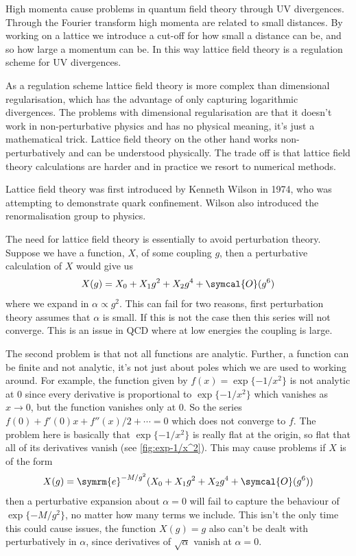 \documentclass[fleqn]{NotesClass}
\newcommand{\e}{\symrm{e}}
\newcommand{\order}{\symcal{O}}
\begin{document}
    High momenta cause problems in quantum field theory through UV divergences.
    Through the Fourier transform high momenta are related to small distances.
    By working on a lattice we introduce a cut-off for how small a distance can be, and so how large a momentum can be.
    In this way lattice field theory is a regulation scheme for UV divergences.
    
    As a regulation scheme lattice field theory is more complex than dimensional regularisation, which has the advantage of only capturing logarithmic divergences.
    The problems with dimensional regularisation are that it doesn't work in non-perturbative physics and has no physical meaning, it's just a mathematical trick.
    Lattice field theory on the other hand works non-perturbatively and can be understood physically.
    The trade off is that lattice field theory calculations are harder and in practice we resort to numerical methods.
    
    Lattice field theory was first introduced by Kenneth Wilson in 1974, who was attempting to demonstrate quark confinement.
    Wilson also introduced the renormalisation group to physics.
    
    The need for lattice field theory is essentially to avoid perturbation theory.
    Suppose we have a function, \(X\), of some coupling \(g\), then a perturbative calculation of \(X\) would give us
    \begin{equation}
        X(g) = X_0 + X_1 g^2 + X_2 g^4 + \order(g^6)
    \end{equation}
    where we expand in \(\alpha \propto g^2\).
    This can fail for two reasons, first perturbation theory assumes that \(\alpha\) is small.
    If this is not the case then this series will not converge.
    This is an issue in QCD where at low energies the coupling is large.
    
    The second problem is that not all functions are analytic.
    Further, a function can be finite and not analytic, it's not just about poles which we are used to working around.
    For example, the function given by \(f(x) = \exp\{-1/x^2\}\) is not analytic at 0 since every derivative is proportional to \(\exp\{-1/x^2\}\) which vanishes as \(x \to 0\), but the function vanishes only at \(0\).
    So the series \(f(0) + f'(0)x + f''(x)/2 + \dotsb = 0\) which does not converge to \(f\).
    The problem here is basically that \(\exp\{-1/x^2\}\) is really flat at the origin, so flat that all of its derivatives vanish (see \cref{fig:exp-1/x^2}).
    This may cause problems if \(X\) is of the form
    \begin{equation}
        X(g) = \e^{-M/g^2} (X_0 + X_1 g^2 + X_2g^4 + \order(g^6))
    \end{equation}
    then a perturbative expansion about \(\alpha = 0\) will fail to capture the behaviour of \(\exp\{-M/g^2\}\), no matter how many terms we include.
    This isn't the only time this could cause issues, the function \(X(g) = g\) also can't be dealt with perturbatively in \(\alpha\), since derivatives of \(\sqrt{\alpha}\) vanish at \(\alpha = 0\).
    
\end{document}
